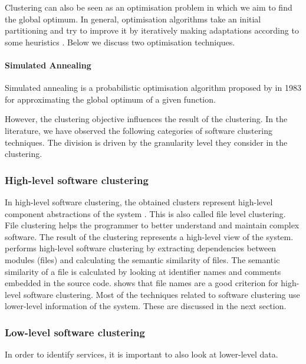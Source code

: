 Clustering can also be seen as an optimisation problem in which we aim to find the global optimum. In general, optimisation algorithms take an initial partitioning and try to improve it by iteratively making adaptations according to some heuristics \cite{wiggerts1997using}. Below we discuss two optimisation techniques.

\paragraph{Simulated Annealing}
Simulated annealing is a probabilistic optimisation algorithm proposed by \citeauthor{kirkpatrick1983optimization} \cite{kirkpatrick1983optimization} in 1983 for approximating the global optimum of a given function.  


However, the clustering objective influences the result of the clustering. In the literature, we have observed the following categories of software clustering techniques. The division is driven by the granularity level they consider in the clustering. 

\subsubsection{High-level software clustering}
In high-level software clustering, the obtained clusters represent high-level component abstractions of the system \cite{saeidi2015search}. This is also called file level clustering. File clustering helps the programmer to better understand and maintain complex software. The result of the clustering represents a high-level view of the system.  \citeauthor{saeidi2015search} \cite{saeidi2015search} performs high-level software clustering by extracting dependencies between modules (files) and calculating the semantic similarity of files. The semantic similarity of a file is calculated by looking at identifier names and comments embedded in the source code. \citeauthor{anquetil1998extracting} \cite{anquetil1998extracting} shows that file names are a good criterion for high-level software clustering. Most of the techniques related to software clustering use lower-level information of the system. These are discussed in the next section.

\subsubsection{Low-level software clustering}
In order to identify services, it is important to also look at lower-level data. 

